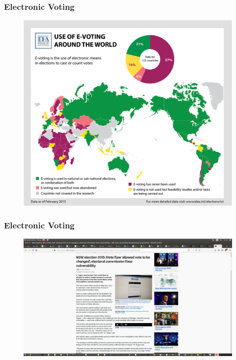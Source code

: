 \documentclass{beamer}
\begin{document}
%

\begin{frame}
\frametitle{Electronic Voting}
\begin{figure}
\includegraphics[scale=0.20]{e-voting-map.png}
\end{figure}
\end{frame}


\begin{frame}
\frametitle{Electronic Voting}
\begin{figure}
\includegraphics[scale=0.20]{Ausvoting.png}
\end{figure}
\end{frame}
\end{document}
